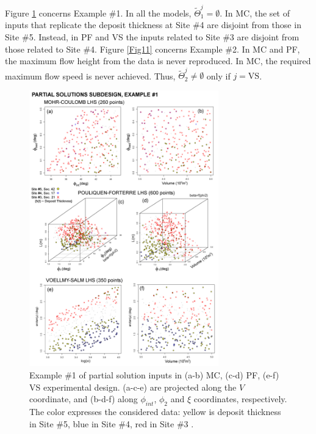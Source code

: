 \documentclass[nhess, manuscript]{copernicus}
\begin{document}
Figure \ref{Fig11_0} concerns Example \#1. In all the models, $\tilde\Theta_1^j=\emptyset$. In MC, the set of inputs that replicate the deposit thickness at Site \#4 are disjoint from those in Site \#5. Instead, in PF and VS the inputs related to Site \#3 are disjoint from those related to Site \#4. Figure \ref{Fig11} concerns Example \#2. In MC and PF, the  maximum flow height from the data is never reproduced. In MC, the required maximum flow speed is never achieved. Thus, $\tilde\Theta_2^j\neq\emptyset$ only if $j=\textrm{VS}$. 

\begin{figure}[H]
\centering
\includegraphics[width=0.73\textwidth]{Fig11_0.png}
\caption{Example \#1 of partial solution inputs in (a-b) MC, (c-d) PF, (e-f) VS experimental design. (a-c-e) are projected along the $V$ coordinate, and (b-d-f) along $\phi_{int}$, $\phi_2$ and $\xi$ coordinates, respectively. The color expresses the considered data: yellow is deposit thickness in Site \#5, blue in Site \#4, red in Site \#3 \citep{Saucedo2008}.}
\label{Fig11_0}
\end{figure}
\end{document}
